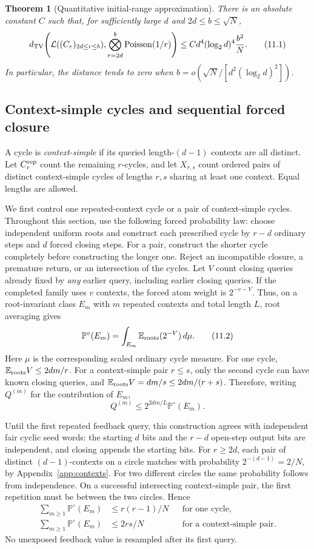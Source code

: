 \documentclass[11pt]{article}
\newtheorem{theorem}{Theorem}[section]
\theoremstyle{remark}
\begin{document}
\begin{theorem}[Quantitative initial-range approximation]\label{thm:birthday}
There is an absolute constant $C$ such that, for sufficiently large $d$ and
$2d\le b\le\sqrt N$,
\[
 d_{\rm TV}\!\left(
 \mathcal L((C_r)_{2d\le r\le b}),
 \bigotimes_{r=2d}^{b}\operatorname{Poisson}(1/r)
 \right)
 \le C d^4(\log_2d)^4\frac{b^2}{N}.
 \tag{11.1}\label{eq:11.1}
\]
In particular, the distance tends to zero when
$b=o(\sqrt N/[d^2(\log_2d)^2])$.
\end{theorem}

\subsection{Context-simple cycles and sequential forced closure}
A cycle is \emph{context-simple} if its queried length-$(d-1)$ contexts are
all distinct. Let $C_r^{\rm rep}$ count the remaining $r$-cycles, and let
$X_{r,s}$ count ordered pairs of distinct context-simple cycles of lengths
$r,s$ sharing at least one context. Equal lengths are allowed.

We first control one repeated-context cycle or a pair of context-simple
cycles. Throughout this section, use the following forced probability law:
choose independent uniform roots and construct each prescribed cycle by
$r-d$ ordinary steps and $d$ forced closing steps. For a pair, construct the
shorter cycle completely before constructing the longer one. Reject an
incompatible closure, a premature return, or an intersection of the cycles.
Let $V$ count closing queries already fixed by \emph{any} earlier query,
including earlier closing queries. If the completed family uses $v$ contexts,
the forced atom weight is $2^{-v-V}$. Thus, on a root-invariant class $E_m$
with $m$ repeated contexts and total length $L$, root averaging gives
\[
 \mathbb P^\circ(E_m)
 =\int_{E_m}\mathbb E_{\rm roots}(2^{-V})\,d\mu.
 \tag{11.2}\label{eq:11.2}
\]
Here $\mu$ is the corresponding scaled ordinary cycle measure.
For one cycle, $\mathbb E_{\rm roots}V\le2dm/r$. For a context-simple pair
$r\le s$, only the second cycle can have known closing queries, and
$\mathbb E_{\rm roots}V=dm/s\le2dm/(r+s)$. Therefore, writing $Q^{(m)}$
for the contribution of $E_m$,
\[
 Q^{(m)}\le2^{2dm/L}\mathbb P^\circ(E_m).
 \tag{11.3}\label{eq:11.3}
\]

Until the first repeated feedback query, this construction agrees with
independent fair cyclic seed words: the starting $d$ bits and the $r-d$
open-step output bits are independent, and closing appends the starting
bits. For $r\ge2d$, each pair of distinct $(d-1)$-contexts on a circle
matches with probability $2^{-(d-1)}=2/N$, by Appendix~\ref{app:contexts}.
For two different circles the same probability follows from independence.
On a successful intersecting context-simple pair, the first repetition
must be between the two circles. Hence
\[
 \begin{aligned}
 \sum_{m\ge1}\mathbb P^\circ(E_m)
 &\le r(r-1)/N &&\text{for one cycle},\\
 \sum_{m\ge1}\mathbb P^\circ(E_m)
 &\le 2rs/N &&\text{for a context-simple pair}.
 \end{aligned}
 \tag{11.4}\label{eq:11.4}
\]
No unexposed feedback value is resampled after its first query.
\end{document}
